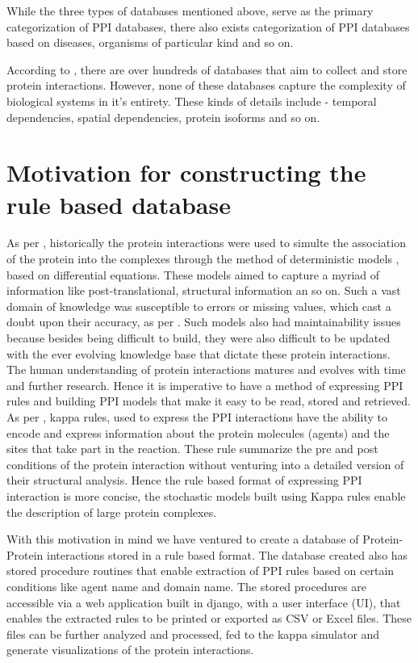 \documentclass[msc,deptreport,ai]{infthesis}      %
\begin{document}
While the three types of databases mentioned above, serve as the primary categorization of PPI databases, there also exists categorization of PPI databases based on diseases, organisms of particular kind and so on.

According to \cite{typesOfPPIdb}, there are over hundreds of databases that aim to collect and store protein interactions. However, none of these databases capture the complexity of biological systems in it's entirety. These kinds of details include - temporal dependencies, spatial dependencies, protein isoforms and so on.

\section{Motivation for constructing the rule based database}
As per \cite{kappaPlatform}, historically the protein interactions were used to simulte the association of the protein into the complexes through the method of deterministic models , based on differential equations. These models aimed to capture a myriad of information like post-translational, structural information an so on. Such a vast domain of knowledge was susceptible to errors or missing values, which cast a doubt upon their accuracy, as per \cite{kappaPlatform}. Such models also had maintainability issues because besides being difficult to build, they were also difficult to be updated with the ever evolving knowledge base that dictate these protein interactions. The human understanding of protein interactions matures and evolves with time and further research. Hence it is imperative to have a method of expressing PPI rules and building PPI models that make it easy to be read, stored and retrieved. As per \cite{kappaPlatform}, kappa rules, used to express the PPI interactions have the ability to encode and express information about the protein molecules (agents) and the sites that take part in the reaction. These rule summarize the pre and post conditions of the protein interaction without venturing into a detailed version of their structural analysis. Hence the rule based format of expressing PPI interaction is more concise, the stochastic models built using Kappa rules enable the description of large protein complexes.

With this motivation in mind we have ventured to create a database of Protein-Protein interactions stored in a rule based format. The database created also has stored procedure routines that enable extraction of PPI rules based on certain conditions like agent name and domain name. The stored procedures are accessible via a web application built in django, with a user interface (UI), that enables the extracted rules to be printed or exported as CSV or Excel files. These files can be further analyzed and processed, fed to the kappa simulator \cite{kasim} and generate visualizations of the protein interactions.
\end{document}
